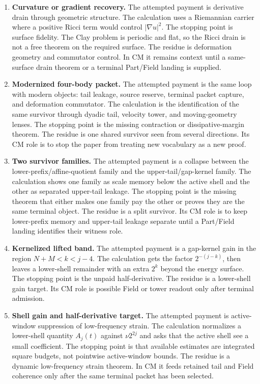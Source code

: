 \begin{enumerate}[leftmargin=*,label=\arabic*.]
\item \textbf{Curvature or gradient recovery.}
The attempted payment is derivative drain through geometric structure.
The calculation uses a Riemannian carrier where a positive Ricci term would
control \(|\nabla u|^2\).
The stopping point is surface fidelity.
The Clay problem is periodic and flat, so the Ricci drain is not a free theorem
on the required surface.
The residue is deformation geometry and commutator control.  In CM it remains
context until a same-surface drain theorem or a terminal Part/Field landing is
supplied.

\item \textbf{Modernized four-body packet.}
The attempted payment is the same loop with modern objects:
tail leakage, source reserve, terminal packet capture, and deformation
commutator.
The calculation is the identification of the same survivor through dyadic tail,
velocity tower, and moving-geometry lenses.
The stopping point is the missing contraction or dissipative-margin theorem.
The residue is one shared survivor seen from several directions.
Its CM role is to stop the paper from treating new vocabulary as a new proof.

\item \textbf{Two survivor families.}
The attempted payment is a collapse between the lower-prefix/affine-quotient
family and the upper-tail/gap-kernel family.
The calculation shows one family as scale memory below the active shell and the
other as separated upper-tail leakage.
The stopping point is the missing theorem that either makes one family pay the
other or proves they are the same terminal object.
The residue is a split survivor.
Its CM role is to keep lower-prefix memory and upper-tail leakage separate
until a Part/Field landing identifies their witness role.

\item \textbf{Kernelized lifted band.}
The attempted payment is a gap-kernel gain in the region \(N+M<k<j-4\).
The calculation gets the factor \(2^{-(j-k)}\), then leaves a lower-shell
remainder with an extra \(2^k\) beyond the energy surface.
The stopping point is the unpaid half-derivative.
The residue is a lower-shell gain target.
Its CM role is possible Field or tower readout only after terminal admission.

\item \textbf{Shell gain and half-derivative target.}
The attempted payment is active-window suppression of low-frequency strain.
The calculation normalizes a lower-shell quantity \(A_j(t)\) against
\(\nu2^{2j}\) and asks that the active shell see a small coefficient.
The stopping point is that available estimates are integrated square budgets,
not pointwise active-window bounds.
The residue is a dynamic low-frequency strain theorem.  In CM it feeds retained
tail and Field coherence only after the same terminal packet has been selected.


\end{enumerate}
